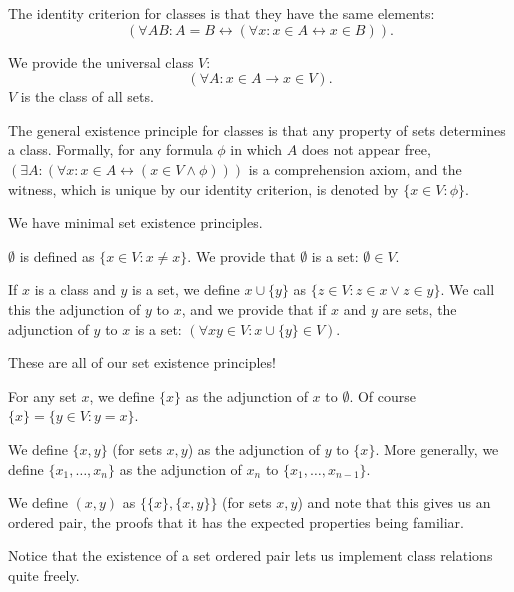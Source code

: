 \documentclass{slides}
\begin{document}
\begin{slide}

The identity criterion for classes is that they have the same elements:  $$(\forall AB: A = B \leftrightarrow (\forall x:x \in A \leftrightarrow x \in B)).$$

We provide the universal class $V$:  $$(\forall A:x \in A \rightarrow x \in V).$$  $V$ is the class of all sets.

The general existence principle for classes is that any property of sets determines a class.  Formally, for any formula $\phi$ in which $A$ does not appear free, $(\exists A:(\forall x:x \in A \leftrightarrow (x \in V \wedge \phi)))$ is a comprehension axiom,
and the witness, which is unique by our identity criterion, is denoted by $\{x \in V:\phi\}$.


\end{slide}

\begin{slide}

We have minimal set existence principles.

$\emptyset$ is defined as $\{x \in V:x \neq x\}$.  We provide that $\emptyset$ is a set: $\emptyset \in V$.

If $x$ is a class and $y$ is a set, we define $x \cup \{y\}$ as $\{z \in V:z \in x \vee z \in y\}$.  We call this the adjunction of $y$ to $x$, and we provide that if $x$ and $y$ are sets, the adjunction of $y$ to $x$ is a set: $(\forall xy \in V:x \cup \{y\} \in V)$.

These are all of our set existence principles!


\end{slide}

\begin{slide}

For any set $x$, we define $\{x\}$ as the adjunction of $x$ to $\emptyset$.  Of course $\{x\} = \{y \in V:y=x\}$.

We define $\{x,y\}$ (for sets $x,y$) as the adjunction of $y$ to $\{x\}$.  More generally, we define $\{x_1,\ldots,x_n\}$
as the adjunction of $x_n$ to $\{x_1,\ldots,x_{n-1}\}$.

We define $(x,y)$ as $\{\{x\},\{x,y\}\}$ (for sets $x,y$) and note that this gives us an ordered pair, the proofs that it has the expected properties being familiar.

Notice that the existence of a set ordered pair lets us implement class relations quite freely.

\end{slide}
\end{document}
